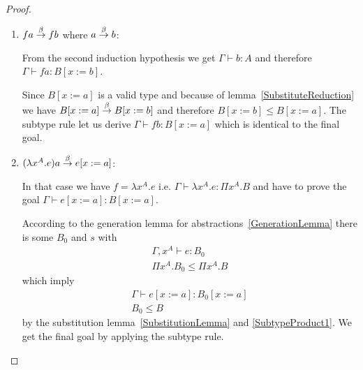 \begin{theorem}
{\begin{proof}
\begin{enumerate}
\begin{enumerate}
\begin{enumerate}
\begin{enumerate}
                        \item $f a \stackrel{\beta}{\to} f b$ where $a \stackrel{\beta}{\to} b$:

                            From the second induction hypothesis we get
                            $\Gamma \vdash b: A$ and therefore $\Gamma \vdash f
                            a : B[x:=b]$.

                            Since $B[x:=a]$ is a valid type and because of
                            lemma~\ref{SubstituteReduction} we have $B[x:=a]
                            \stackrel{\beta}{\to} B[x:=b]$ and therefore $B[x:=b] \le
                            B[x:=a]$. The subtype rule let us derive
                            $\Gamma \vdash f b: B[x:=a]$ which is identical to
                            the final goal.

                        \item $(\lambda x^A. e) a \stackrel{\beta}{\to} e[x:=a]$:

                            In that case we have $f = \lambda x^A. e$ i.e.
                            $\Gamma \vdash \lambda x^A. e: \Pi x^A. B$ and have
                            to prove the goal $\Gamma \vdash e[x:=a] : B[x:=a]$.

                            According to the generation lemma for
                            abstractions~\ref{GenerationLemma} there is some
                            $B_0$ and $s$ with
                            $$
                            \begin{array}{l}
                                \Gamma,x^A \vdash e: B_0
                                \\
                                \Pi x^A.  B_0 \le \Pi x^A.B
                            \end{array}
                            $$
                            which imply
                            $$
                            \begin{array}{l}
                                \Gamma \vdash e[x:=a]: B_0[x:=a]
                                \\
                                B_0 \le B
                            \end{array}
                            $$
                            by the substitution lemma~\ref{SubstitutionLemma}
                            and \ref{SubtypeProduct1}. We get the final goal by
                            applying the subtype rule.
                    \end{enumerate}


\end{enumerate}
\end{enumerate}
\end{enumerate}
\end{proof}}
\end{theorem}
